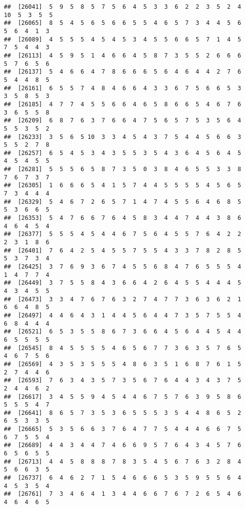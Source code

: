 \documentclass[
]{book}
\begin{document}
\begin{verbatim}
##  [26041]  5  9  5  8  5  7  5  6  4  5  3  3  6  2  2  3  5  2  4 10  5  3  5  5
##  [26065]  8  5  4  5  6  5  6  6  5  5  4  6  5  7  3  4  4  5  6  5  6  4  1  3
##  [26089]  4  5  5  5  4  5  4  5  3  4  5  5  6  6  5  7  1  4  5  7  5  4  4  3
##  [26113]  4  5  9  5  1  4  6  6  4  5  8  7  3  5  5  2  6  6  6  5  7  6  5  6
##  [26137]  5  4  6  6  4  7  8  6  6  6  5  6  4  6  4  4  2  7  6  5  4  4  8  5
##  [26161]  6  5  5  7  4  8  4  6  6  4  3  3  6  7  5  6  6  5  3  3  5  8  5  3
##  [26185]  4  7  7  4  5  5  6  6  4  6  5  8  6  6  5  4  6  7  6  3  6  5  5  8
##  [26209]  6  8  7  6  3  7  6  6  4  7  5  6  5  7  5  3  5  6  4  5  5  3  5  2
##  [26233]  3  5  6  5 10  3  3  4  5  4  3  7  5  4  4  5  6  6  3  5  5  2  7  8
##  [26257]  6  5  4  5  3  4  3  5  5  3  5  4  3  6  4  5  6  4  5  4  5  4  5  5
##  [26281]  5  5  5  6  5  8  7  3  5  0  3  8  4  6  5  5  3  3  8  7  6  7  3  7
##  [26305]  1  6  6  6  5  4  1  5  7  4  4  5  5  5  5  4  5  6  5  7  3  4  4  4
##  [26329]  5  4  6  7  2  6  5  7  1  4  7  4  5  5  6  4  6  8  5  5  3  6  6  5
##  [26353]  5  4  7  6  6  7  6  4  5  8  3  4  4  7  4  4  3  8  6  4  6  4  5  4
##  [26377]  5  5  5  4  5  4  4  6  7  5  6  4  5  5  7  6  4  2  2  2  3  1  8  6
##  [26401]  7  6  4  2  5  4  5  5  7  5  5  4  3  3  7  8  2  8  5  5  3  7  3  4
##  [26425]  3  7  6  9  3  6  7  4  5  5  6  8  4  7  6  5  5  5  4  1  4  7  7  4
##  [26449]  3  7  5  5  8  4  3  6  6  4  2  6  4  5  5  4  4  4  5  4  3  4  5  5
##  [26473]  3  3  4  7  6  7  6  3  2  7  4  7  7  3  6  3  6  2  1  6  6  4  8  5
##  [26497]  4  4  6  4  3  1  4  4  5  6  4  4  7  3  5  7  5  5  4  6  8  4  4  4
##  [26521]  6  5  3  5  5  8  6  7  3  6  6  4  5  6  4  4  5  4  4  6  5  5  5  5
##  [26545]  8  4  5  5  5  5  4  6  5  6  7  7  3  6  3  5  7  6  5  4  6  7  5  6
##  [26569]  4  3  5  3  5  5  5  4  8  6  3  5  1  6  8  7  6  1  5  2  7  4  4  6
##  [26593]  7  6  3  4  3  5  7  3  5  6  7  6  4  4  3  4  3  7  5  2  4  4  6  2
##  [26617]  3  4  5  5  9  4  5  4  4  6  7  5  7  6  3  9  5  8  6  5  5  5  4  7
##  [26641]  8  6  5  7  3  5  3  6  5  5  5  3  5  4  4  8  6  5  2  6  5  3  3  5
##  [26665]  5  3  5  6  6  3  7  6  4  7  7  5  4  4  4  6  6  7  5  6  7  5  5  4
##  [26689]  4  4  3  4  4  7  4  6  6  9  5  7  6  4  3  4  5  7  6  6  5  6  5  5
##  [26713]  4  4  5  8  8  8  7  8  3  5  4  5  6  7  6  3  2  8  4  5  6  6  3  5
##  [26737]  6  4  6  2  7  1  5  4  6  6  6  5  3  5  9  5  5  6  4  4  5  3  5  4
##  [26761]  7  3  4  6  4  1  3  4  4  6  6  7  6  7  2  6  5  4  6  4  6  4  6  5

\end{verbatim}
\end{document}
